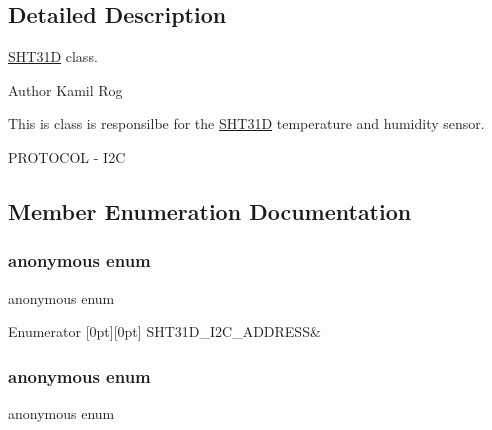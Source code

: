 \subsection{Detailed Description}
\hyperlink{classSHT31D}{S\+H\+T31D} class. 

\begin{DoxyAuthor}{Author}
Kamil Rog
\end{DoxyAuthor}
This is class is responsilbe for the \hyperlink{classSHT31D}{S\+H\+T31D} temperature and humidity sensor.

P\+R\+O\+T\+O\+C\+OL -\/ I2C 

\subsection{Member Enumeration Documentation}
\mbox{\label{classSHT31D_a5810e24af0e5737b6df24089366100fe}} 
\subsubsection{\texorpdfstring{anonymous enum}{anonymous enum}}
{\footnotesize\ttfamily anonymous enum\hspace{0.3cm}{\ttfamily [private]}}

\begin{DoxyEnumFields}{Enumerator}
[0pt][0pt]{}\mbox{\label{classSHT31D_a5810e24af0e5737b6df24089366100fea7a00c3f8439a0de223d6fe77132acc69}} 
S\+H\+T31\+D\+\_\+\+I2\+C\+\_\+\+A\+D\+D\+R\+E\+SS&\\
\hline

\end{DoxyEnumFields}
\mbox{\label{classSHT31D_abcfdc15982f0b22747afa7e3c325706a}} 
\subsubsection{\texorpdfstring{anonymous enum}{anonymous enum}}
{\footnotesize\ttfamily anonymous enum\hspace{0.3cm}{\ttfamily [private]}}

